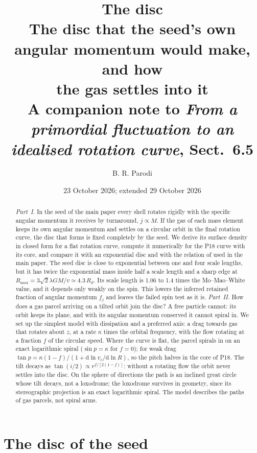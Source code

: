 \documentclass[11pt,a4paper]{article}
\title{The disc\\[4pt]
\large The disc that the seed's own angular momentum would make, and how\\
the gas settles into it\\[2pt]
\normalsize A companion note to \emph{From a primordial fluctuation to an idealised rotation curve}, Sect.~6.5}
\author{B. R. Parodi}
\date{23 October 2026; extended 29 October 2026}
\newcommand{\dd}{\mathrm{d}}
\newcommand{\Rmax}{R_{\max}}
\begin{document}
\maketitle

\begin{abstract}
\noindent \emph{Part~I.} In the seed of the main paper every shell rotates rigidly
with the specific angular momentum it receives by turnaround, $j\propto M$. If the
gas of each mass element keeps its own angular momentum and settles on a circular
orbit in the final rotation curve, the disc that forms is fixed completely by the
seed. We derive its surface density in closed form for a flat rotation curve,
compute it numerically for the P18 curve with its core, and compare it with an
exponential disc and with the relation of \citet{Mo1998} used in the main paper. The
seed disc is close to exponential between one and four scale lengths, but it has
twice the exponential mass inside half a scale length and a sharp edge at
$\Rmax=3\sqrt2\lambda GM/v\simeq4.3\,R_d$. Its scale length is 1.06 to 1.4 times the
Mo--Mao--White value, and it depends only weakly on the spin. This lowers the
inferred retained fraction of angular momentum $f_j$ and leaves the failed spin test
as it is. \emph{Part~II.} How does a gas parcel arriving on a tilted orbit join the
disc? A free particle cannot: its orbit keeps its plane, and with its angular
momentum conserved it cannot spiral in. We set up the simplest model with
dissipation and a preferred axis: a drag towards gas that rotates about $z$, at a
rate $\kappa$ times the orbital frequency, with the flow rotating at a fraction $f$
of the circular speed. Where the curve is flat, the parcel spirals in on an exact
logarithmic spiral ($\sin p=\kappa$ for $f=0$); for weak drag
$\tan p=\kappa(1-f)/(1+\dd\ln v_c/\dd\ln R)$, so the pitch halves in the core of
P18. The tilt decays as $\tan(i/2)\propto r^{f/[2(1-f)]}$: without a rotating flow the
orbit never settles into the disc. On the sphere of directions the path is an
inclined great circle whose tilt decays, not a loxodrome; the loxodrome survives in
geometry, since its stereographic projection is an exact logarithmic spiral. The
model describes the paths of gas parcels, not spiral arms.
\end{abstract}

\tableofcontents
\bigskip

\part{The disc of the seed}
\end{document}
